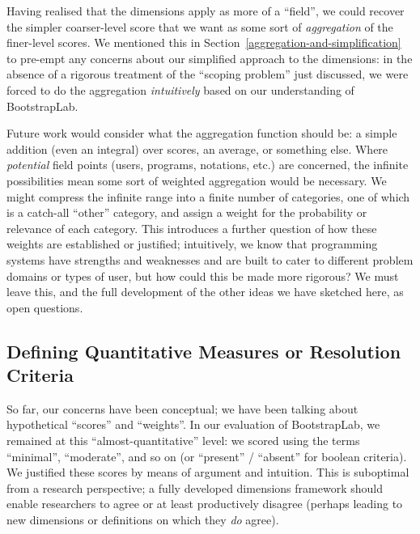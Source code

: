 \documentclass[ twoside,openright,titlepage,numbers=noenddot,headinclude,footinclude,cleardoublepage=empty,abstract=on,
                BCOR=5mm,paper=a4,fontsize=11pt
                ]{scrreprt}
\theoremstyle{definition}
\begin{document}
Having realised that the dimensions apply as more of a ``field'', we
could recover the simpler coarser-level score that we want as some sort
of \emph{aggregation} of the finer-level scores. We mentioned this in
Section~\ref{aggregation-and-simplification} to pre-empt any concerns
about our simplified approach to the dimensions: in the absence of a
rigorous treatment of the ``scoping problem'' just discussed, we were
forced to do the aggregation \emph{intuitively} based on our
understanding of BootstrapLab.

Future work would consider what the aggregation function should be: a
simple addition (even an integral) over scores, an average, or something
else. Where \emph{potential} field points (users, programs, notations,
etc.) are concerned, the infinite possibilities mean some sort of
weighted aggregation would be necessary. We might compress the infinite
range into a finite number of categories, one of which is a catch-all
``other'' category, and assign a weight for the probability or relevance
of each category. This introduces a further question of how these
weights are established or justified; intuitively, we know that
programming systems have strengths and weaknesses and are built to cater
to different problem domains or types of user, but how could this be
made more rigorous? We must leave this, and the full development of the
other ideas we have sketched here, as open questions.

\hypertarget{defining-quantitative-measures-or-resolution-criteria}{\subsection{Defining Quantitative Measures or Resolution
Criteria}\label{defining-quantitative-measures-or-resolution-criteria}}

So far, our concerns have been conceptual; we have been talking about
hypothetical ``scores'' and ``weights''. In our evaluation of
BootstrapLab, we remained at this ``almost-quantitative'' level: we
scored using the terms ``minimal'', ``moderate'', and so on (or
``present'' / ``absent'' for boolean criteria). We justified these
scores by means of argument and intuition. This is suboptimal from a
research perspective; a fully developed dimensions framework should
enable researchers to agree or at least productively disagree (perhaps
leading to new dimensions or definitions on which they \emph{do} agree).
\end{document}
